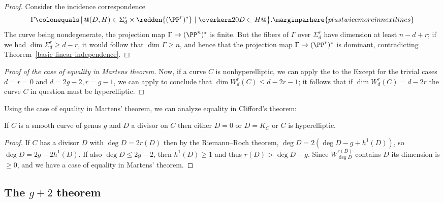 \begin{proof}
Consider the incidence correspondence
$$
\Gamma \colonequals  \bigl\{@(D, H) \in \Sigma^r_d\times 
\redden{(\PP^r)^*}
\mid \overkern20 D \subset H@\bigr\}.
\marginparhere{\hsize=2\hsize plus twice more in next lines}
$$
The curve being nondegenerate, the projection map $\Gamma \to  (\PP^n)^*$
is finite. But the fibers of $\Gamma$ over $\Sigma^r_d$ have dimension
at least $n-d+r$; if we had $\dim \Sigma^r_d \geq d-r$, it would follow
that $\dim \Gamma \geq n$, and hence that the projection map $\Gamma
\to  (\PP^r)^*$ is dominant, contradicting Theorem~\ref{basic
linear independence}.
\end{proof}

\begin{proof}[Proof of the case of equality in Martens theorem]
 Now, if a curve $C$ is nonhyperelliptic, we can apply the 
%
 to the 
%
Except for the trivial cases $d=r=0$
 and $d=2g-2, r=g-1$,
 we can apply 
to conclude that
 $\dim W^r_d(C) \leq d-2r-1$; it follows that if 
$\dim W^r_d(C)
 = d-2r$ the curve $C$ in question must be hyperelliptic.
\unif
\end{proof}

Using the case of equality in Martens' theorem, we can analyze equality in
Clifford's theorem:
%

\begin{corollary}\label{equality in Clifford from Martens}
If $C$ is a smooth curve of genus $g$ and $D$ 
a divisor on $C$ 
then either $D =0$ or $D=K_C$ or $C$
is hyperelliptic.
\unif
\end{corollary}

\begin{proof}
If $C$ has a divisor $D$ with $\deg D =2 r(D)$ then by the Riemann--Roch
theorem,  $\deg D  = 2(\deg D-g+h^1(D))$,
so $\deg D = 2g-2h^1(D)$. If also $\deg D\leq 2g-2$, then $h^1(D) \geq 1$
and thus $r(D) >\deg D-g$. Since $W^{r(D)}_{\deg D}$ contains $D$
its dimension
is $\geq 0$, and we have a case of equality in Martens' theorem.
\end{proof}


\subsection*{The $g+2$ theorem}

